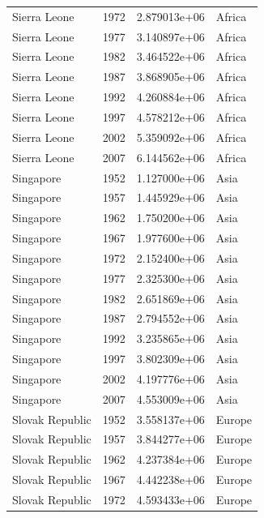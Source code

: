 \documentclass[
  letterpaper,
  DIV=11,
  numbers=noendperiod]{scrreprt}
\begin{document}
\begin{tcolorbox}
\begin{tabular}{lrrl}
Sierra Leone             &  1972 &  2.879013e+06 &    Africa \\
Sierra Leone             &  1977 &  3.140897e+06 &    Africa \\
Sierra Leone             &  1982 &  3.464522e+06 &    Africa \\
Sierra Leone             &  1987 &  3.868905e+06 &    Africa \\
Sierra Leone             &  1992 &  4.260884e+06 &    Africa \\
Sierra Leone             &  1997 &  4.578212e+06 &    Africa \\
Sierra Leone             &  2002 &  5.359092e+06 &    Africa \\
Sierra Leone             &  2007 &  6.144562e+06 &    Africa \\
Singapore                &  1952 &  1.127000e+06 &      Asia \\
Singapore                &  1957 &  1.445929e+06 &      Asia \\
Singapore                &  1962 &  1.750200e+06 &      Asia \\
Singapore                &  1967 &  1.977600e+06 &      Asia \\
Singapore                &  1972 &  2.152400e+06 &      Asia \\
Singapore                &  1977 &  2.325300e+06 &      Asia \\
Singapore                &  1982 &  2.651869e+06 &      Asia \\
Singapore                &  1987 &  2.794552e+06 &      Asia \\
Singapore                &  1992 &  3.235865e+06 &      Asia \\
Singapore                &  1997 &  3.802309e+06 &      Asia \\
Singapore                &  2002 &  4.197776e+06 &      Asia \\
Singapore                &  2007 &  4.553009e+06 &      Asia \\
Slovak Republic          &  1952 &  3.558137e+06 &    Europe \\
Slovak Republic          &  1957 &  3.844277e+06 &    Europe \\
Slovak Republic          &  1962 &  4.237384e+06 &    Europe \\
Slovak Republic          &  1967 &  4.442238e+06 &    Europe \\
Slovak Republic          &  1972 &  4.593433e+06 &    Europe \\

\end{tabular}
\end{tcolorbox}
\end{document}
